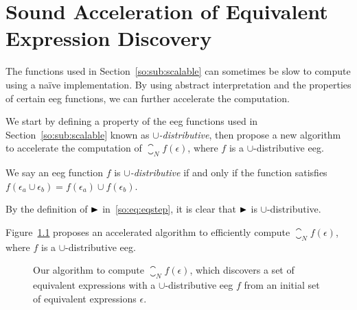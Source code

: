 \chapter{Sound Acceleration of Equivalent Expression Discovery}
\label{app:sound_acceleration}

The functions used in Section~\ref{so:sub:scalable} can sometimes be slow to
compute using a na\"ive implementation.  By using abstract interpretation and
the properties of certain \gls{eeg} functions, we can further accelerate the
computation.

We start by defining a property of the \gls{eeg} functions used in
Section~\ref{so:sub:scalable} known as \emph{$\cup$-distributive}, then propose
a new algorithm to accelerate the computation of $\closure_N f (\epsilon)$,
where $f$ is a $\cup$-distributive \gls{eeg}\@.
\begin{definition}
    We say an \gls{eeg} function $f$ is \emph{$\cup$-distributive} if and only
    if the function satisfies $f(\epsilon_a \cup \epsilon_b) = f(\epsilon_a)
    \cup f(\epsilon_b)$.
\end{definition}
\begin{corollary}
    By the definition of $\operatorname{\blacktriangleright}$ in~\eqref{so:eq:eqstep}, it is clear that
    $\operatorname{\blacktriangleright}$ is $\cup$-distributive.
    {}\label{so:cor:union}
\end{corollary}

Figure~\ref{so:alg:closure} proposes an accelerated algorithm to efficiently
compute $\closure_N f(\epsilon)$, where $f$ is a $\cup$-distributive
\gls{eeg}\@.
\begin{figure}[ht]
    \centering
    \begin{algorithmic}
                \EndIf{}
            \EndFor{}
        \EndFunction{}
    \end{algorithmic}
    \caption{%
        Our algorithm to compute $\closure_N f (\epsilon)$, which discovers a
        set of equivalent expressions with a $\cup$-distributive \gls{eeg} $f$
        from an initial set of equivalent expressions $\epsilon$.
    }\label{so:alg:closure}
\end{figure}

